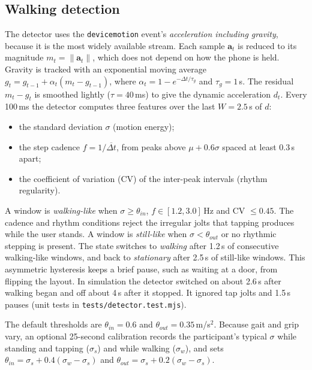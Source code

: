 \documentclass[sigconf,nonacm]{acmart}
\begin{document}
\subsection{Walking detection}
\label{sec:detector}
The detector uses the \texttt{devicemotion} event's \emph{acceleration including gravity}, because it is the most widely available stream. Each sample $\mathbf{a}_t$ is reduced to its magnitude $m_t=\lVert\mathbf{a}_t\rVert$, which does not depend on how the phone is held. Gravity is tracked with an exponential moving average $g_t = g_{t-1} + \alpha_t(m_t-g_{t-1})$, where $\alpha_t = 1-e^{-\Delta t/\tau_g}$ and $\tau_g=1$\,s. The residual $m_t-g_t$ is smoothed lightly ($\tau=40$\,ms) to give the dynamic acceleration $d_t$. Every 100\,ms the detector computes three features over the last $W=2.5$\,s of $d$:
\begin{itemize}
  \item the standard deviation $\sigma$ (motion energy);
  \item the step cadence $f = 1/\overline{\Delta t}$, from peaks above $\mu + 0.6\sigma$ spaced at least 0.3\,s apart;
  \item the coefficient of variation (CV) of the inter-peak intervals (rhythm regularity).
\end{itemize}
A window is \emph{walking-like} when $\sigma \ge \theta_{in}$, $f \in [1.2, 3.0]$\,Hz and CV $\le 0.45$. The cadence and rhythm conditions reject the irregular jolts that tapping produces while the user stands. A window is \emph{still-like} when $\sigma < \theta_{out}$ or no rhythmic stepping is present. The state switches to \emph{walking} after 1.2\,s of consecutive walking-like windows, and back to \emph{stationary} after 2.5\,s of still-like windows. This asymmetric hysteresis keeps a brief pause, such as waiting at a door, from flipping the layout. In simulation the detector switched on about 2.6\,s after walking began and off about 4\,s after it stopped. It ignored tap jolts and 1.5\,s pauses (unit tests in \texttt{tests/detector.test.mjs}).

The default thresholds are $\theta_{in}=0.6$ and $\theta_{out}=0.35$\,m/s$^2$. Because gait and grip vary, an optional 25-second calibration records the participant's typical $\sigma$ while standing and tapping ($\sigma_s$) and while walking ($\sigma_w$), and sets $\theta_{in}=\sigma_s+0.4(\sigma_w-\sigma_s)$ and $\theta_{out}=\sigma_s+0.2(\sigma_w-\sigma_s)$.
\end{document}
